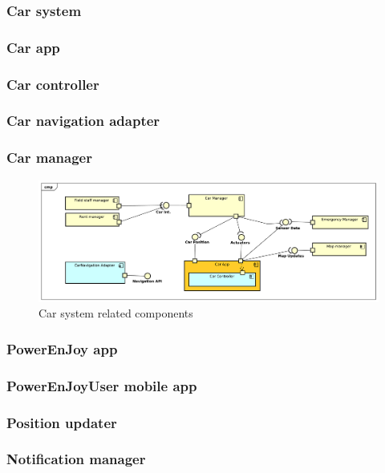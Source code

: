 \documentclass[english]{article}
\begin{document}
\subsubsection*{Car system}
	
	\subsubsection{Car app}
	
		\subsubsection{Car controller}
		\subsubsection{Car navigation adapter}
	\subsubsection{Car manager}
	
	\begin{figure}[H]
		\centering
		\includegraphics[scale=0.35]{./ComponentDiagrams/Car.pdf}%
		\caption{Car system related components}
	\end{figure}
	
\subsubsection*{PowerEnJoy app}
	
	\subsubsection{PowerEnJoyUser mobile app}
		\subsubsection{Position updater}
		\subsubsection{Notification manager}
\end{document}

